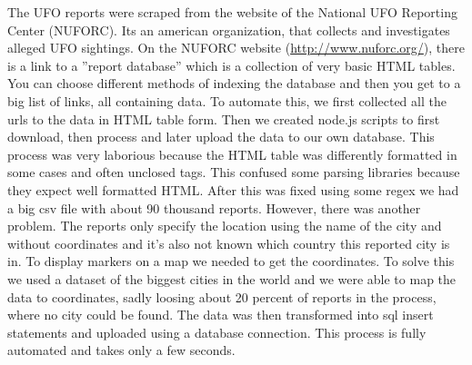 \documentclass{article}
\begin{document}
The UFO reports were scraped from the website of the National UFO Reporting Center (NUFORC). Its an american organization, that collects and investigates alleged UFO sightings. On the NUFORC website (\url{http://www.nuforc.org/}), there is a link to a ''report database'' which is a collection of very basic HTML tables. You can choose different methods of indexing the database and then you get to a big list of links, all containing data. To automate this, we first collected all the urls to the data in HTML table form. Then we created node.js scripts to first download, then process and later upload the data to our own database. This process was very laborious because the HTML table was differently formatted in some cases and often unclosed tags. This confused some parsing libraries because they expect well formatted HTML. After this was fixed using some regex we had a big csv file with about 90 thousand reports. However, there was another problem. The reports only specify the location using the name of the city and without coordinates and it's also not known which country this reported city is in. To display markers on a map we needed to get the coordinates. To solve this we used a dataset of the biggest cities in the world and we were able to map the data to coordinates, sadly loosing about 20 percent of reports in the process, where no city could be found. The data was then transformed into sql insert statements and uploaded using a database connection. This process is fully automated and takes only a few seconds. 



\end{document}
